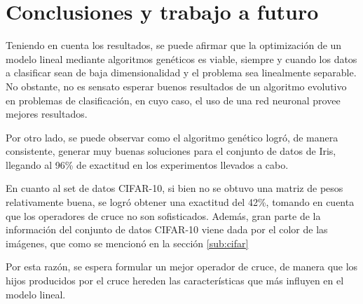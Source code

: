 \documentclass[conference]{IEEEtran}
\begin{document}
\section{Conclusiones y trabajo a futuro}

Teniendo en cuenta los resultados, se puede afirmar que la optimización de un modelo lineal mediante algoritmos genéticos es viable, siempre y cuando los datos a clasificar sean de baja dimensionalidad y el problema sea linealmente separable. No obstante, no es sensato esperar buenos resultados de un algoritmo evolutivo en problemas de clasificación, en cuyo caso, el uso de una red neuronal provee mejores resultados. 

Por otro lado, se puede observar como el algoritmo genético logró, de manera consistente, generar muy buenas soluciones para el conjunto de datos de Iris, llegando al 96\% de exactitud en los experimentos llevados a cabo. 

En cuanto al set de datos CIFAR-10, si bien no se obtuvo una matriz de pesos relativamente buena, se logró obtener una exactitud del 42\%, tomando en cuenta que los operadores de cruce no son sofisticados. Además, gran parte de la información del conjunto de datos CIFAR-10 viene dada por el color de las imágenes, que como se mencionó en la sección \ref{sub:cifar}

Por esta razón, se espera formular un mejor operador de cruce, de manera que los hijos producidos por el cruce hereden las características que más influyen en el modelo lineal.

{}

\end{document}
